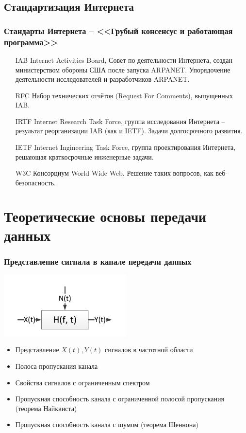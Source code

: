\documentclass[utf8]{beamer}
\begin{document}
\subsection{Стандартизация Интернета}
\begin{frame}
\frametitle {Стандарты Интернета -- <<Грубый консенсус и работающая программа>>}
\begin{itemize}
 \item [IAB] Internet Activities Board, Совет по деятельности Интернета, создан министерством обороны США после запуска ARPANET. Упорядочение деятельности исследователей и разработчиков ARPANET.
 \item [RFC] Набор технических отчётов (Request For Comments), выпущенных IAB.
 \item [IRTF] Internet Research Task Force, группа исследования Интернета -- результат реорганизации IAB (как и IETF). Задачи долгосрочного развития.
 \item [IETF] Internet Ingineering Task Force, группа проектирования Интернета, решающая краткосрочные инженерные задачи.
 \item [W3C] Консорциум World Wide Web. Решение таких вопросов, как веб-безопасность.
\end{itemize}
\end{frame}
\section{Теоретические основы передачи данных}
\begin{frame}	
\frametitle{Представление сигнала в канале передачи данных}
\begin{center}
\includegraphics[width=0.5\textwidth]{pic/channel.pdf}
\end{center}
\begin{itemize}
	\item Представление $X(t), Y(t)$ сигналов в частотной области
	\item Полоса пропускания канала
	\item Свойства сигналов с ограниченным спектром
	\item Пропускная способность канала с ограниченной полосой пропускания (теорема Найквиста)
	\item Пропускная способность канала с шумом (теорема Шеннона)
\end{itemize}
\end{frame}
\end{document}
